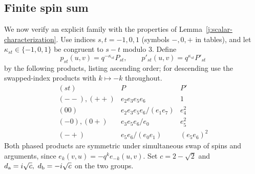 \subsection{Finite spin sum}
We now verify an explicit family with the properties of
Lemma~\ref{j:scalar-characterization}. Use indices $s,t=-1,0,1$
(symbols $-,0,+$ in tables), and let
$\kappa_{st}\in\{-1,0,1\}$ be congruent to $s-t$ modulo 3. Define
\[
p_{st}(u,v)=q^{-\kappa_{st}}P_{st},\qquad p'_{st}(u,v)=q^{\kappa_{st}}P'_{st}
\]
by the following products, listing ascending order; for descending use the swapped-index products with $k\mapsto-k$ throughout.
\[
\begin{array}{c|cc}
(st)&P&P'\\ \hline
(--),(++)&e_2 e_3 e_5 e_6&1\\
(00)&e_2 e_3 e_5 e_6/(e_1e_7)&e_4^2\\
(-0),(0+)&e_3 e_5 e_6/e_0&e_5^2\\
(-+)&e_5e_6/(e_0e_1)&(e_5 e_6)^2
\end{array}
\]
Both phased products are symmetric under simultaneous swap of spins and
arguments, since $e_k(v,u)=-q^k e_{-k}(u,v)$. Set $c=2-\sqrt2$ and
$d_{\rm a}=i\sqrt c,\ d_{\rm b}=-i\sqrt c$ on the two groups.

